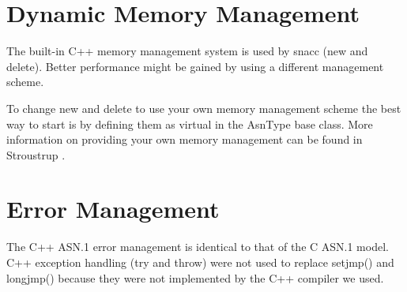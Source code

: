 \section{\label{mem-C++-section}Dynamic Memory Management}

The built-in C++ memory management system is used by snacc ({\C new}
and {\C delete}).  Better performance might be gained by using a
different management scheme.

To change {\C new} and {\C delete} to use your own memory
management scheme the best way to start is by defining them as virtual
in the {\C AsnType} base class.  More information on providing your
own memory management can be found in Stroustrup \cite{stroustrup}.

\section{\label{error-C++-section}Error Management}

The C++ ASN.1 error management is identical to that of the C ASN.1
model.  C++ exception handling ({\C try} and {\C throw}) were not
used to replace {\C setjmp()} and {\C longjmp()} because they were not
implemented by the C++ compiler we used.
